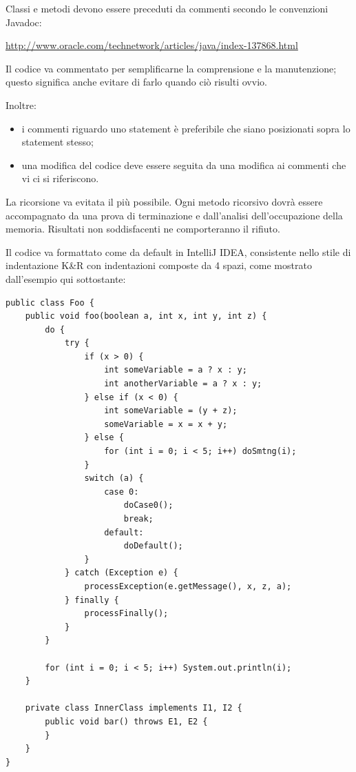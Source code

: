 		 \label{commenti}

			Classi e metodi devono essere preceduti da commenti secondo le convenzioni Javadoc:

			\begin{center}
				\url{http://www.oracle.com/technetwork/articles/java/index-137868.html}
			\end{center}

			Il codice va commentato per semplificarne la comprensione e la manutenzione; questo significa anche evitare
			di farlo quando ciò risulti ovvio.

			Inoltre:
			\begin{itemize}
				\item i commenti riguardo uno statement è preferibile che siano posizionati sopra lo statement stesso;
				\item una modifica del codice deve essere seguita da una modifica ai commenti che vi ci si riferiscono.
			\end{itemize}
		

			La ricorsione va evitata il più possibile. Ogni metodo ricorsivo dovrà essere accompagnato da una prova
			di terminazione e dall'analisi dell'occupazione della memoria. Risultati non soddisfacenti ne comporteranno il rifiuto.

\newpage

		 \label{formattazione}

			Il codice va formattato come da default in IntelliJ IDEA, consistente nello stile di
			indentazione K&R con indentazioni composte da 4 spazi, come mostrato dall'esempio qui sottostante:

			\lstset{language=Java}
			\begin{lstlisting}[frame=single]
public class Foo {
    public void foo(boolean a, int x, int y, int z) {
        do {
            try {
                if (x > 0) {
                    int someVariable = a ? x : y;
                    int anotherVariable = a ? x : y;
                } else if (x < 0) {
                    int someVariable = (y + z);
                    someVariable = x = x + y;
                } else {
                    for (int i = 0; i < 5; i++) doSmtng(i);
                }
                switch (a) {
                    case 0:
                        doCase0();
                        break;
                    default:
                        doDefault();
                }
            } catch (Exception e) {
                processException(e.getMessage(), x, z, a);
            } finally {
                processFinally();
            }
        }

        for (int i = 0; i < 5; i++) System.out.println(i);
    }

    private class InnerClass implements I1, I2 {
        public void bar() throws E1, E2 {
        }
    }
}
			\end{lstlisting}


